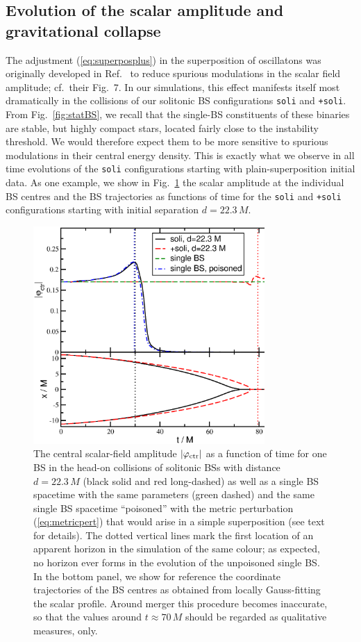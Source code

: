\documentclass[]{iopart}
\begin{document}
\subsection{Evolution of the scalar amplitude and gravitational collapse}
%
The adjustment (\ref{eq:superposplus}) in the superposition of
oscillatons was originally developed in Ref.~\cite{Helfer:2018vtq}
to reduce spurious modulations in the scalar field amplitude;
cf.~their Fig.~7. In our simulations, this effect manifests itself
most dramatically in the collisions of our solitonic BS configurations
{\tt soli} and {\tt +soli}.  From Fig.~\ref{fig:statBS}, we recall
that the single-BS constituents of these binaries are stable, but
highly compact stars, located fairly close to the instability
threshold. We would therefore expect them to be more sensitive to
spurious modulations in their central energy density. This is exactly
what we observe in all time evolutions of the {\tt soli} configurations
starting with plain-superposition initial data. As one example, we
show in Fig.~\ref{fig:soli_ampctr} the scalar amplitude at the
individual BS centres and the BS trajectories as functions of time
for the {\tt soli} and {\tt +soli} configurations starting with
initial separation $d=22.3\,M$.
%
\begin{figure}
    \centering
    \includegraphics[width=250pt]{ampctr_sBS.eps}
    \caption{
    The central scalar-field amplitude $|\varphi_{\rm ctr}|$ as a
    function of time for one BS in the head-on collisions of solitonic
    BSs with distance $d=22.3\,M$ (black solid and red long-dashed)
    as well as a single BS spacetime with the same parameters (green
    dashed) and the same single BS spacetime ``poisoned'' with the
    metric perturbation (\ref{eq:metricpert}) that would arise in
    a simple superposition (see text for details). The dotted
    vertical lines mark the first location of an apparent horizon
    in the simulation of the same colour; as expected, no horizon
    ever forms in the evolution of the unpoisoned single BS.  In
    the bottom panel, we show for reference the coordinate trajectories
    of the BS centres as obtained from locally Gauss-fitting the
    scalar profile. Around merger this procedure becomes inaccurate,
    so that the values around $t\approx 70\,M$ should be regarded
    as qualitative measures, only.
    }
    \label{fig:soli_ampctr}
\end{figure}
\end{document}
